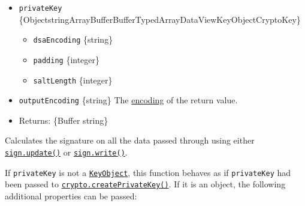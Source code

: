\begin{itemize}
\tightlist
\item
  \texttt{privateKey}
  \{Object\textbar string\textbar ArrayBuffer\textbar Buffer\textbar TypedArray\textbar DataView\textbar KeyObject\textbar CryptoKey\}

  \begin{itemize}
  \tightlist
  \item
    \texttt{dsaEncoding} \{string\}
  \item
    \texttt{padding} \{integer\}
  \item
    \texttt{saltLength} \{integer\}
  \end{itemize}
\item
  \texttt{outputEncoding} \{string\} The
  \href{buffer.md\#buffers-and-character-encodings}{encoding} of the
  return value.
\item
  Returns: \{Buffer \textbar{} string\}
\end{itemize}

Calculates the signature on all the data passed through using either
\hyperref[signupdatedata-inputencoding]{\texttt{sign.update()}} or
\href{stream.md\#writablewritechunk-encoding-callback}{\texttt{sign.write()}}.

If \texttt{privateKey} is not a
\hyperref[class-keyobject]{\texttt{KeyObject}}, this function behaves as
if \texttt{privateKey} had been passed to
\hyperref[cryptocreateprivatekeykey]{\texttt{crypto.createPrivateKey()}}.
If it is an object, the following additional properties can be passed:

